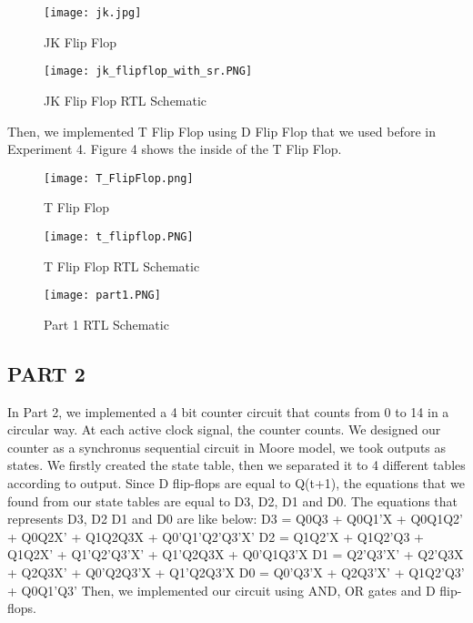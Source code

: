 \documentclass[pdftex,12pt,a4paper]{article}
\begin{document}
\begin{figure}[hbt!]
	\centering
	\texttt{[image: jk.jpg]}	
	\caption{JK Flip Flop}
	\label{fig1}
\end{figure}

\begin{figure}[hbt!]
	\centering
	\texttt{[image: jk\_flipflop\_with\_sr.PNG]}	
	\caption{JK Flip Flop RTL Schematic}
	\label{fig1}
\end{figure}

Then, we implemented T Flip Flop using D Flip Flop that we used before in Experiment 4.  Figure 4 shows the inside of the T Flip Flop.

\begin{figure}[hbt!]
	\centering
	\texttt{[image: T\_FlipFlop.png]}	
	\caption{T Flip Flop}
	\label{fig1}
\end{figure}

\begin{figure}[hbt!]
	\centering
	\texttt{[image: t\_flipflop.PNG]}	
	\caption{T Flip Flop RTL Schematic}
	\label{fig1}
\end{figure}


\begin{figure}[hbt!]
	\centering
	\texttt{[image: part1.PNG]}	
	\caption{Part 1 RTL Schematic}
	\label{fig1}
\end{figure}

\clearpage
\subsection{PART 2}

In Part 2, we implemented a 4 bit counter circuit that counts from 0 to 14 in a circular way. At each active clock signal, the counter counts. We designed our counter as a synchronus sequential circuit in Moore model, we took outputs as states. We firstly created the state table, then we separated it to 4 different tables according to output. Since D flip-flops are equal to Q(t+1), the equations that we found from our state tables are equal to D3, D2, D1 and D0. The equations that represents D3, D2 D1 and D0 are like below:
D3 = Q0Q3 + Q0Q1'X + Q0Q1Q2' + Q0Q2X' + Q1Q2Q3X + Q0'Q1'Q2'Q3'X'
D2 = Q1Q2'X + Q1Q2'Q3 + Q1Q2X' + Q1'Q2'Q3'X' + Q1'Q2Q3X + Q0'Q1Q3'X
D1 = Q2'Q3'X' + Q2'Q3X + Q2Q3X' + Q0'Q2Q3'X + Q1'Q2Q3'X
D0 = Q0'Q3'X + Q2Q3'X' + Q1Q2'Q3' + Q0Q1'Q3'
Then, we implemented our circuit using AND, OR gates and D flip-flops.
\end{document}
